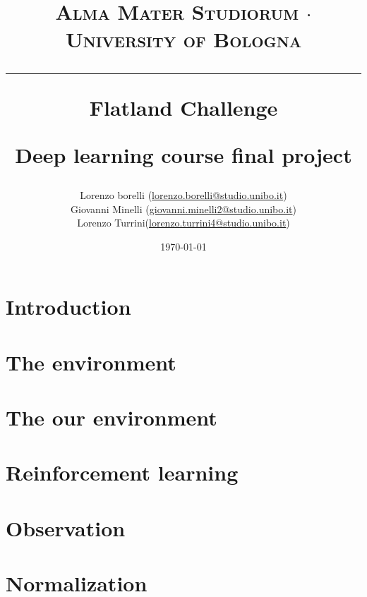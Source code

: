 \documentclass[a4paper,14pt]{extreport}
\begin{document}
\title{
	{{\large{\textsc{Alma Mater Studiorum $\cdot$ University of Bologna}}}}
	\rule{\textwidth}{0.4pt}\vspace{3mm}
	\textbf{Flatland Challenge}
	
	Deep learning course final project
}

\author{Lorenzo borelli (\href{mailto:lorenzo.borelli@studio.unibo.it}{lorenzo.borelli@studio.unibo.it}) 
\\ Giovanni Minelli (\href{mailto:giovanni.minelli2@studio.unibo.it}{giovanni.minelli2@studio.unibo.it}) 
\\ Lorenzo Turrini(\href{mailto:lorenzo.turrini4@studio.unibo.it}{lorenzo.turrini4@studio.unibo.it})}
\date{\today}
\maketitle
\newpage
\tableofcontents
\listoffigures
\listoftables
\newpage

\chapter{Introduction}


\chapter{The environment}


\chapter{The our environment}


\chapter{Reinforcement learning}


\chapter{Observation}


\chapter{Normalization}
\label{chap:normalization}

\end{document}
